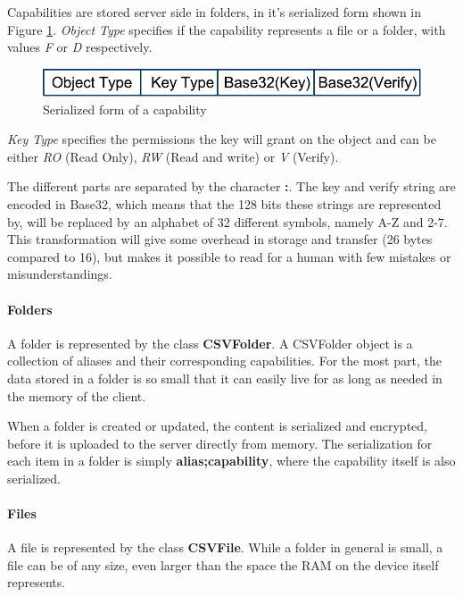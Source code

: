 \documentclass[pdftex,english,10pt,b5paper,twoside]{book}
\begin{document}
Capabilities are stored server side in folders, in it's serialized form shown
in Figure \ref{fig:CAP:serial}. \emph{Object Type} specifies if the capability
represents a file or a folder, with values \emph{F} or \emph{D}
respectively.

\begin{figure}[h!]
    \centering
    \includegraphics[scale=0.6]{CapabilitySerialization.pdf}
    \caption{Serialized form of a capability}
    \label{fig:CAP:serial}
\end{figure}

\emph{Key Type} specifies the permissions the key will grant on the object and
can be either \emph{RO} (Read Only), \emph{RW} (Read and write) or \emph{V}
(Verify).

The different parts are separated by the character \textbf{:}. The key and
verify string are encoded in Base32, which means that the 128 bits these
strings are represented by, will be replaced by an alphabet of 32 different
symbols, namely A-Z and 2-7. This transformation will give some overhead in
storage and transfer (26 bytes compared to 16), but makes it possible to read for a human
with few mistakes or misunderstandings.

\paragraph{Folders}

A folder is represented by the class \textbf{CSVFolder}. A CSVFolder object is
a collection of aliases and their corresponding capabilities. For
the most part, the data stored in a folder is so small that it can easily live for
as long as needed in the memory of the client.

When a folder is created or updated, the content is serialized and encrypted,
before it is uploaded to the server directly from memory. The serialization for
each item in a folder is simply \textbf{alias;capability}, where the capability
itself is also serialized.

\paragraph{Files}

A file is represented by the class \textbf{CSVFile}. While a folder in general is small,
a file can be of any size, even larger than the space the \ac{RAM} on the
device itself represents.
\end{document}
